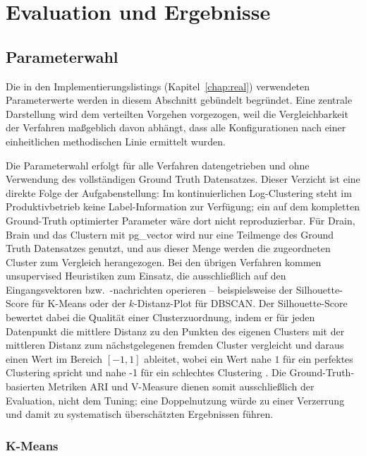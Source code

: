 \chapter{Evaluation und Ergebnisse}
\label{chap:eval}

\section{Parameterwahl}
\label{sec:eval:parameterwahl}

Die in den Implementierungslistings (Kapitel~\ref{chap:real}) verwendeten
Parameterwerte werden in diesem Abschnitt gebündelt begründet. Eine zentrale
Darstellung wird dem verteilten Vorgehen vorgezogen, weil die Vergleichbarkeit
der Verfahren maßgeblich davon abhängt, dass alle Konfigurationen nach einer
einheitlichen methodischen Linie ermittelt wurden.

Die Parameterwahl erfolgt für alle Verfahren datengetrieben und
ohne Verwendung des vollständigen Ground Truth Datensatzes. Dieser Verzicht ist eine direkte
Folge der Aufgabenstellung: Im kontinuierlichen Log-Clustering steht im
Produktivbetrieb keine Label-Information zur Verfügung; ein auf dem kompletten
Ground-Truth optimierter Parameter wäre dort nicht reproduzierbar. 
Für Drain, Brain und das Clustern mit pg\_vector wird nur eine Teilmenge des 
Ground Truth Datensatzes genutzt, und aus dieser Menge werden die zugeordneten Cluster zum Vergleich herangezogen. Bei den übrigen Verfahren
kommen unsupervised Heuristiken zum Einsatz, die
ausschließlich auf den Eingangsvektoren bzw.\ -nachrichten operieren --
beispielsweise der Silhouette-Score für K-Means oder
der $k$-Distanz-Plot für DBSCAN. Der Silhouette-Score bewertet dabei die
Qualität einer Clusterzuordnung, indem er für jeden Datenpunkt die
mittlere Distanz zu den Punkten des eigenen Clusters mit der mittleren
Distanz zum nächstgelegenen fremden Cluster vergleicht und daraus einen
Wert im Bereich $[-1, 1]$
ableitet, wobei ein Wert nahe $1$ für ein perfektes Clustering spricht und nahe -1 für ein schlechtes Clustering \cite{GeeksforGeeksSilhouette}.
Die Ground-Truth-basierten Metriken ARI und
V-Measure dienen somit ausschließlich der Evaluation, nicht dem
Tuning; eine Doppelnutzung würde zu einer Verzerrung und damit zu
systematisch überschätzten Ergebnissen führen.

\subsection{K-Means}
\label{sec:eval:param:kmeans}

